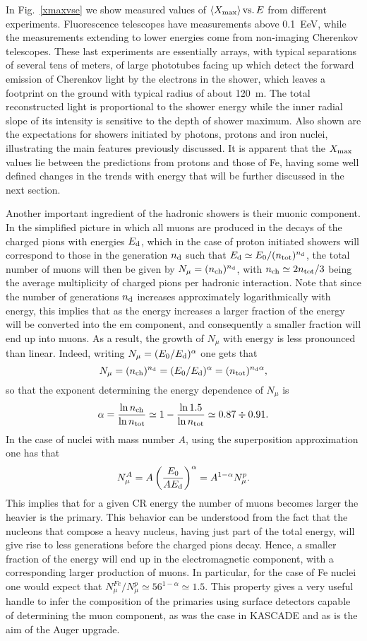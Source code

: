 \documentclass[twoside,12pt]{article}
\newcommand{\be}{\begin{equation}}
\newcommand{\ee}{\end{equation}}
\begin{document}
In Fig.~\ref{xmaxvse} we show measured values of $\langle X_{\rm max}\rangle\,{\rm vs.}\, E$ from different experiments. Fluorescence telescopes have measurements above 0.1~EeV, while the measurements extending to lower energies come from non-imaging Cherenkov telescopes. These last experiments are essentially arrays, with typical separations of several tens of meters, of large phototubes facing up which detect the forward emission of Cherenkov light by the electrons in the shower, which leaves a footprint on the ground with typical radius of about 120~m. The total reconstructed light is proportional to the shower energy while the inner radial slope of its intensity is sensitive to the depth of shower maximum.
Also shown are the expectations for showers initiated by photons, protons and iron nuclei, illustrating the main features previously discussed. It is apparent that the $X_{\rm max}$ values lie between the predictions from protons and those of Fe, having some well defined changes in the trends with energy that will be further discussed in the next section.


Another important ingredient of the hadronic showers is their muonic component. In the simplified picture in which all muons are produced in the decays of the charged pions with energies $E_{\rm d}$, which in the case of proton initiated showers will correspond to those in the generation $n_{\rm d}$ such that $E_{\rm d}\simeq E_0/(n_{\rm tot})^{n_{\rm d}}$, the total number of muons will then be given by $N_\mu=(n_{\rm ch})^{n_{\rm d}}$,
with $n_{\rm ch}\simeq 2 n_{\rm tot}/3$ being the average multiplicity of charged pions per hadronic interaction. 
Note that since the number of generations $n_{\rm d}$ increases approximately logarithmically with energy, this implies that as the energy increases a larger fraction of the energy will be converted into the em component, and consequently a smaller fraction will end up into muons. As a result, the growth of $N_\mu$ with energy is 
less pronounced than linear. Indeed, writing $N_\mu=(E_0/E_{\rm d})^\alpha$ one gets that
\be 
N_\mu=(n_{\rm ch})^{n_{\rm d}}=(E_0/E_{\rm d})^\alpha=(n_{\rm tot})^{n_{\rm d}\alpha},
\ee 
so that the exponent determining the energy dependence of $N_\mu$ is 
\be
\alpha=\frac{\ln n_{\rm ch}}{\ln n_{\rm tot}}\simeq 1-\frac{\ln 1.5}{\ln n_{\rm tot}}\simeq 0.87\div 0.91.
\ee
In the case of nuclei with mass number $A$, using the superposition approximation one has that
\be 
N_\mu^A=A\left(\frac{E_0}{AE_{\rm d}}\right)^\alpha=A^{1-\alpha}N_\mu^p.
\ee 
This implies that for a given CR energy the number of muons becomes larger the heavier is the primary. This behavior can be understood from the fact that the nucleons that compose a heavy nucleus, having just part of the total energy,  will give rise to less generations before the charged pions decay. Hence, a smaller fraction of the energy will end up in the electromagnetic component, with a corresponding larger production of muons.
In particular, for the case of Fe nuclei one would expect that $N_\mu^{Fe}/N_\mu^p\simeq 56^{1-\alpha}\simeq 1.5$.
This property gives a  very useful handle to infer the composition of the primaries using surface detectors capable of determining the muon component, as was the case in KASCADE and as is the aim of the Auger upgrade.
\end{document}
